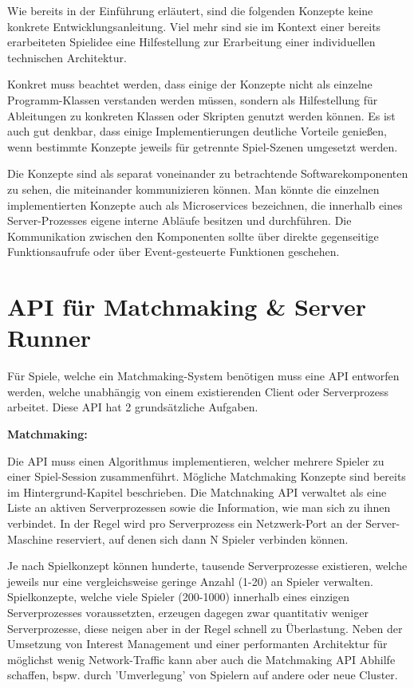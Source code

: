 Wie bereits in der Einführung erläutert, sind die folgenden Konzepte keine konkrete Entwicklungsanleitung. Viel mehr sind sie im Kontext einer bereits erarbeiteten Spielidee eine Hilfestellung zur Erarbeitung einer individuellen technischen Architektur.

Konkret muss beachtet werden, dass einige der Konzepte nicht als einzelne Programm-Klassen verstanden werden müssen, sondern als Hilfestellung für Ableitungen zu konkreten Klassen oder Skripten genutzt werden können. Es ist auch gut denkbar, dass einige Implementierungen deutliche Vorteile genießen, wenn bestimmte Konzepte jeweils für getrennte Spiel-Szenen \cite{Wikipedia.2012} umgesetzt werden.

Die Konzepte sind als separat voneinander zu betrachtende Softwarekomponenten zu sehen, die miteinander kommunizieren können. Man könnte die einzelnen implementierten Konzepte auch als Microservices \cite{Thones.2015} bezeichnen, die innerhalb eines Server-Prozesses eigene interne Abläufe besitzen und durchführen. Die Kommunikation zwischen den Komponenten sollte über direkte gegenseitige Funktionsaufrufe oder über Event-gesteuerte Funktionen \cite{Michelson.2006} geschehen.

\section{API für Matchmaking \& Server Runner}

Für Spiele, welche ein Matchmaking-System benötigen muss eine API entworfen werden, welche unabhängig von einem existierenden Client oder Serverprozess arbeitet. Diese API hat 2 grundsätzliche Aufgaben. 

\textbf{Matchmaking:}

Die API muss einen Algorithmus implementieren, welcher mehrere Spieler zu einer Spiel-Session zusammenführt. Mögliche Matchmaking Konzepte sind bereits im Hintergrund-Kapitel beschrieben. Die Matchnaking API verwaltet als eine Liste an aktiven Serverprozessen sowie die Information, wie man sich zu ihnen verbindet. In der Regel wird pro Serverprozess ein Netzwerk-Port an der Server-Maschine reserviert, auf denen sich dann N Spieler verbinden können.

Je nach Spielkonzept können hunderte, tausende Serverprozesse existieren, welche jeweils nur eine vergleichsweise geringe Anzahl (1-20) an Spieler verwalten. Spielkonzepte, welche viele Spieler (200-1000) innerhalb eines einzigen Serverprozesses voraussetzten, erzeugen dagegen zwar quantitativ weniger Serverprozesse, diese neigen aber in der Regel schnell zu Überlastung. Neben der Umsetzung von Interest Management und einer performanten Architektur für möglichst wenig Network-Traffic kann aber auch die Matchmaking API Abhilfe schaffen, bspw. durch 'Umverlegung' von Spielern auf andere oder neue Cluster.

